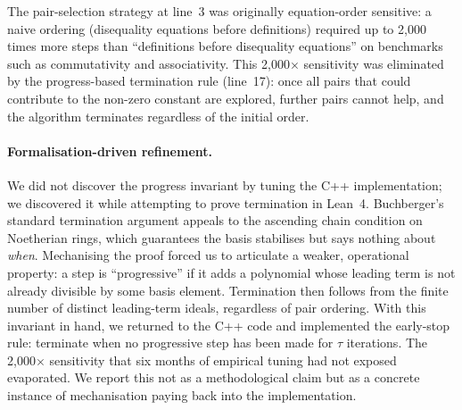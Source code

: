 \documentclass[runningheads]{llncs}
\begin{document}
The pair-selection strategy at line~3 was originally equation-order
sensitive: a naive ordering (disequality equations before
definitions) required up to 2{,}000 times more steps than
``definitions before disequality equations'' on benchmarks such as
commutativity and associativity. This 2{,}000$\times$ sensitivity
was eliminated by the progress-based termination rule
(line~17): once all pairs that could contribute to the non-zero constant
are explored, further pairs cannot help, and the algorithm
terminates regardless of the initial order.

\paragraph{Formalisation-driven refinement.}
We did not discover the progress invariant by tuning the C++
implementation; we discovered it while attempting to prove
termination in Lean~4. Buchberger's standard termination argument
appeals to the ascending chain condition on Noetherian rings, which
guarantees the basis stabilises but says nothing about \emph{when}.
Mechanising the proof forced us to articulate a weaker, operational
property: a step is ``progressive'' if it adds a polynomial whose
leading term is not already divisible by some basis element.
Termination then follows from the finite number of distinct
leading-term ideals, regardless of pair ordering. With this
invariant in hand, we returned to the C++ code and implemented
the early-stop rule: terminate when no progressive step has been
made for $\tau$ iterations. The 2{,}000$\times$ sensitivity that
six months of empirical tuning had not exposed evaporated. We
report this not as a methodological claim but as a concrete
instance of mechanisation paying back into the implementation.
\end{document}
